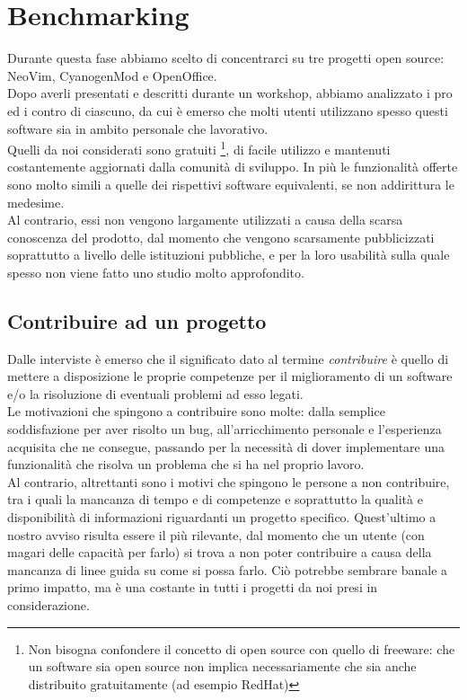 \documentclass[12pt]{article} %
\begin{document}
\section{Benchmarking}
Durante questa fase abbiamo scelto di concentrarci su tre progetti open source: NeoVim, CyanogenMod e OpenOffice.\\
Dopo averli presentati e descritti durante un workshop, abbiamo analizzato i pro ed i contro di ciascuno, da cui è emerso che molti utenti utilizzano spesso questi software sia in ambito personale che lavorativo.\\
Quelli da noi considerati sono gratuiti \footnote{Non bisogna confondere il concetto di open source con quello di freeware: che un software sia open source non implica necessariamente che sia anche distribuito gratuitamente (ad esempio RedHat)}, di facile utilizzo e mantenuti costantemente aggiornati dalla comunità di sviluppo. In più le funzionalità offerte sono molto simili a quelle dei rispettivi software equivalenti, se non addirittura le medesime.\\
Al contrario, essi non vengono largamente utilizzati a causa della scarsa conoscenza del prodotto, dal momento che vengono scarsamente pubblicizzati soprattutto a livello delle istituzioni pubbliche, e per la loro usabilità sulla quale spesso non viene fatto uno studio molto approfondito.\\
\subsection{Contribuire ad un progetto}
Dalle interviste è emerso che il significato dato al termine \emph{contribuire} è quello di mettere a disposizione le proprie competenze per il miglioramento di un software e/o la risoluzione di eventuali problemi ad esso legati.\\
Le motivazioni che spingono a contribuire sono molte: dalla semplice soddisfazione per aver risolto un bug, all'arricchimento personale e l'esperienza acquisita che ne consegue, passando per la necessità di dover implementare una funzionalità che risolva un problema che si ha nel proprio lavoro.\\
Al contrario, altrettanti sono i motivi che spingono le persone a non contribuire, tra i quali la mancanza di tempo e di competenze e soprattutto la qualità e disponibilità di informazioni riguardanti un progetto specifico. Quest'ultimo a nostro avviso risulta essere il più rilevante, dal momento che un utente (con magari delle capacità per farlo) si trova a non poter contribuire a causa della mancanza di linee guida su come si possa farlo. Ciò potrebbe sembrare banale a primo impatto, ma è una costante in tutti i progetti da noi presi in considerazione.
\newpage
\end{document}
